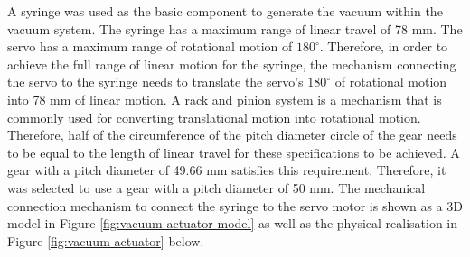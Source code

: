 A syringe was used as the basic component to generate the vacuum within the vacuum system. The syringe has a maximum range of linear travel of 78 mm. The servo has a maximum range of rotational motion of $180^{\circ}$. Therefore, in order to achieve the full range of linear motion for the syringe, the mechanism connecting the servo to the syringe needs to translate the servo's $180^{\circ}$ of rotational motion into 78 mm of linear motion. A rack and pinion system is a mechanism that is commonly used for converting translational motion into rotational motion. Therefore, half of the circumference of the pitch diameter circle of the gear needs to be equal to the length of linear travel for these specifications to be achieved. A gear with a pitch diameter of 49.66 mm satisfies this requirement. Therefore, it was selected to use a gear with a pitch diameter of 50 mm. The mechanical connection mechanism to connect the syringe to the servo motor is shown as a 3D model in Figure \ref{fig:vacuum-actuator-model} as well as the physical realisation in Figure \ref{fig:vacuum-actuator} below.

%

